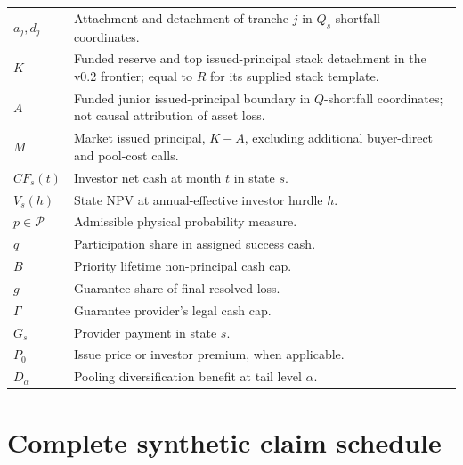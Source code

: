 \documentclass[11pt,a4paper]{article}
\begin{document}
\begin{longtable}{@{}P{0.18\textwidth}P{0.73\textwidth}@{}}
\(a_j,d_j\) & Attachment and detachment of tranche \(j\) in \(Q_s\)-shortfall coordinates. \\
\(K\) & Funded reserve and top issued-principal stack detachment in the v0.2 frontier; equal to \(R\) for its supplied stack template. \\
\(A\) & Funded junior issued-principal boundary in \(Q\)-shortfall coordinates; not causal attribution of asset loss. \\
\(M\) & Market issued principal, \(K-A\), excluding additional buyer-direct and pool-cost calls. \\
\(CF_s(t)\) & Investor net cash at month \(t\) in state \(s\). \\
\(V_s(h)\) & State NPV at annual-effective investor hurdle \(h\). \\
\(p\in\mathcal P\) & Admissible physical probability measure. \\
\(q\) & Participation share in assigned success cash. \\
\(B\) & Priority lifetime non-principal cash cap. \\
\(g\) & Guarantee share of final resolved loss. \\
\(\Gamma\) & Guarantee provider's legal cash cap. \\
\(G_s\) & Provider payment in state \(s\). \\
\(P_0\) & Issue price or investor premium, when applicable. \\
\(D_\alpha\) & Pooling diversification benefit at tail level \(\alpha\). \\
\bottomrule
\end{longtable}

\section{Complete synthetic claim schedule}
\end{document}
